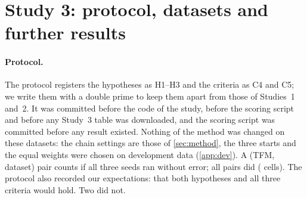 \begin{table}[!htbp]
\centering
\caption{Study~2, LLP with bags of 8: AUC per dataset (mean over 3 seeds). Bold: best non-oracle method among those
shown.}
\label{tab:s2llpds}
\small
\resizebox{\textwidth}{!}{}
\end{table}

\begin{table}[!htbp]
\centering
\caption{Study~2, PLL: accuracy per dataset (mean over 3 seeds). Bold: best non-oracle method among those shown.}
\label{tab:s2pllds}
\small
\resizebox{\textwidth}{!}{}
\end{table}

\begin{table}[!htbp]
\centering
\caption{Study~2: mean score of every method (datasets averaged over 3 seeds). PRODEN (default) failed on gas-drift in
5 of 6 cells (non-finite probabilities, reproduced on a rerun); its $q=0.3$ mean is over 9 datasets and its $q=0.6$
gas-drift entry uses one seed.}
\label{tab:s2means}
\small
\resizebox{\textwidth}{!}{}
\end{table}

\FloatBarrier
\section{Study 3: protocol, datasets and further results}\label{app:s3}
\paragraph{Protocol.} The protocol registers the hypotheses as H1--H3 and the criteria as C4 and C5; we write them with
a double prime to keep them apart from those of Studies~1 and~2. It was committed before the code of the study, before
the scoring script and before any Study~3 table was downloaded, and the scoring script was committed before any
result existed. Nothing of the method was changed on these datasets: the chain settings are those of \cref{sec:method},
the three starts and the equal weights were chosen on development data (\cref{app:dev}). A (TFM, dataset) pair counts
if all three seeds ran without error; all  pairs did ( cells). The protocol also
recorded our expectations: that both hypotheses and all three criteria would hold. Two did not.

